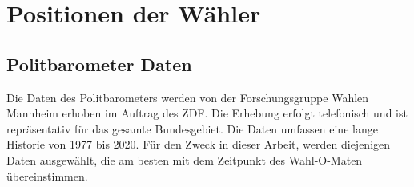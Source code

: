 \section{Positionen der Wähler}\label{Sec-Wählerpositionen}

\subsection{Politbarometer Daten}
Die Daten des Politbarometers \citep{politbarometer} werden von der Forschungsgruppe Wahlen Mannheim erhoben im Auftrag des ZDF. Die Erhebung erfolgt telefonisch und ist repräsentativ für das gesamte Bundesgebiet. Die Daten umfassen eine lange Historie von 1977 bis 2020. Für den Zweck in dieser Arbeit, werden diejenigen Daten ausgewählt, die am besten mit dem Zeitpunkt des Wahl-O-Maten übereinstimmen.

